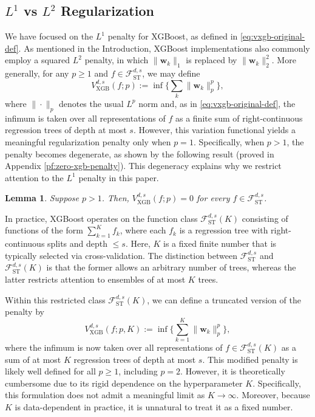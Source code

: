 \documentclass[10pt]{article}
\newtheorem{lemma}{Lemma}
\newcommand{\fst}{{\mathcal{F}^{d, s}_{\text{ST}}}}
\newcommand{\vxgb}{{V^{d, s}_{\text{XGB}}}}
\newcommand{\wbf}{{\mathbf{w}}}
\begin{document}
\subsection{$L^1$ vs $L^2$ Regularization}
\label{sec:squared-l2-penalty}

We have focused on the $L^1$ penalty for XGBoost, as defined in
\eqref{eq:vxgb-original-def}. As mentioned in the Introduction,
XGBoost implementations also commonly employ a squared $L^2$ penalty, 
in which $\|\wbf_k\|_1$ is replaced by $\|\wbf_k\|_2^2$. 
More generally, for any $p \ge 1$ and $f \in \fst$, we may define
\begin{equation*}
    \vxgb(f; p) := \inf \Big\{\sum_k \|\wbf_k\|_p^p \Big\},
\end{equation*}
where $\|\cdot\|_p$ denotes the usual $L^p$ norm and, as in
\eqref{eq:vxgb-original-def}, the infimum is taken over all
representations of $f$ as a finite sum of right-continuous regression 
trees of depth at most $s$. However, this variation functional yields 
a meaningful regularization penalty only when $p = 1$. Specifically, 
when $p > 1$, the penalty becomes degenerate, as shown by the 
following result (proved in Appendix \ref{pf:zero-xgb-penalty}). 
This degeneracy explains why we restrict attention to the $L^1$ 
penalty in this paper.
\begin{lemma}\label{lem:zero-xgb-penalty}
    Suppose $p > 1$. Then, $\vxgb(f; p) = 0$ for every $f \in \fst$. 
\end{lemma}
In practice, XGBoost operates on the function class $\fst(K)$
consisting of functions of the form  $\sum_{k=1}^K f_k$, where each
$f_k$ is a regression tree with right-continuous splits and depth 
$\le s$. Here, $K$ is a fixed finite number that is typically 
selected via cross-validation. The distinction between $\fst$ and 
$\fst(K)$ is that the former allows an arbitrary number of trees, 
whereas the latter restricts attention to ensembles of at most $K$ 
trees.

Within this restricted class $\fst(K)$, we can define a truncated
version of the penalty by 
\begin{equation*}
    \vxgb(f; p, K) := \inf \Big\{\sum_{k=1}^K \|\wbf_k\|_p^p \Big\},
\end{equation*}
where the infimum is now taken over all representations of 
$f \in \fst(K)$ as a sum of at most $K$ regression trees of depth 
at most $s$. This modified penalty is likely well defined for all 
$p \ge 1$, including $p = 2$. However, it is theoretically cumbersome 
due to its rigid dependence on the hyperparameter $K$. Specifically, 
this formulation does not admit a meaningful limit as 
$K \rightarrow \infty$. Moreover, because $K$ is data-dependent in 
practice, it is unnatural to treat it as a fixed number.
\end{document}
